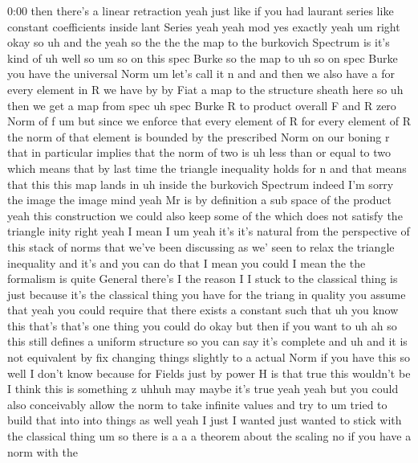 \begin{unfinished}{0:00}
then  there's  a  linear  retraction  yeah
just  like  if  you  had  laurant  series  like
constant  coefficients  inside  lant  Series
yeah  yeah  mod  yes  exactly
yeah
um  right  okay  so  uh  and  the  yeah  so  the
the  the  map  to  the  burkovich  Spectrum  is
it's  kind  of  uh
well
so
um  so  on  this  spec  Burke  so  the  map
to
uh  so
on  spec
Burke  you  have  the  universal
Norm  um  let's  call  it
n  and  and  then  we  also  have  a  for  every
element  in  R  we  have  by  by
Fiat  a  map  to  the  structure  sheath  here
so  uh  then  we  get  a  map  from  spec  uh
spec  Burke  R  to  product  overall  F  and
R  zero  Norm  of
f
um
but  since  we  enforce  that  every  element
of  R  for  every  element  of  R  the  norm  of
that  element  is  bounded  by  the
prescribed  Norm  on  our  boning  r  that  in
particular  implies  that  the  norm  of  two
is  uh  less  than  or  equal  to  two  which
means  that  by  last
time  the  triangle  inequality
holds  for  n  and  that  means  that  this
this  map  lands  in
uh  inside  the  burkovich  Spectrum
indeed  I'm  sorry  the  image  the  image
mind  yeah  Mr  is  by  definition  a  sub
space  of  the  product
yeah
this  construction  we  could  also  keep
some  of  the  which  does  not  satisfy  the
triangle
inity  right  yeah  I  mean  I  um  yeah  it's
it's  natural  from  the  perspective  of
this  stack  of  norms  that  we've  been
discussing  as  we'  seen  to  relax  the
triangle  inequality  and  it's  and  you  can
do  that  I  mean  you  could  I  mean  the  the
formalism  is  quite  General  there's  I  the
reason  I  I  stuck  to  the  classical  thing
is  just  because  it's  the  classical  thing
you  have  for  the  triang  in
quality  you  assume  that  yeah  you  could
require  that  there  exists  a  constant
such  that  uh  you  know  this  that's  that's
one  thing  you  could  do  okay  but  then  if
you  want
to  uh  ah  so  this  still  defines  a  uniform
structure  so  you  can  say  it's
complete  and  uh  and  it  is  not  equivalent
by  fix  changing  things  slightly  to  a
actual  Norm  if  you  have  this  so  well  I
don't  know  because  for
Fields  just  by
power  H  is  that  true  this  wouldn't  be  I
think  this
is  something  z  uhhuh  may  maybe  it's  true
yeah  yeah  but  you  could  also  conceivably
allow  the  norm  to  take  infinite  values
and  try
to  um  tried  to  build  that
into  into  things  as  well  yeah  I  just  I
wanted  just  wanted  to  stick  with  the
classical  thing
um  so  there  is  a  a  a  theorem
about  the
scaling  no  if  you  have  a  norm  with  the

\end{unfinished}
